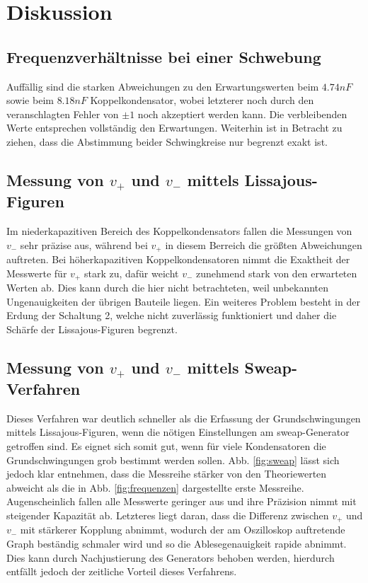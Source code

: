 \section{Diskussion}
\label{sec:Diskussion}

\subsection{Frequenzverhältnisse bei einer Schwebung}
\label{sec:Schwebung}

Auffällig sind die starken Abweichungen zu den Erwartungswerten beim $4.74nF$ sowie beim $8.18nF$ Koppelkondensator, wobei letzterer noch durch den veranschlagten Fehler von $\pm 1$ noch akzeptiert werden kann. Die verbleibenden Werte entsprechen vollständig den Erwartungen. Weiterhin ist in Betracht zu ziehen, dass die Abstimmung beider Schwingkreise nur begrenzt exakt ist.

\subsection{Messung von $v_+$ und $v_-$ mittels Lissajous-Figuren}
\label{sec:messung}

Im niederkapazitiven Bereich des Koppelkondensators fallen die Messungen von $v_-$ sehr präzise aus, während bei $v_+$ in diesem Berreich die größten Abweichungen auftreten. Bei höherkapazitiven Koppelkondensatoren nimmt die Exaktheit der Messwerte für $v_+$ stark zu, dafür weicht $v_-$ zunehmend stark von den erwarteten Werten ab. Dies kann durch die hier nicht betrachteten, weil unbekannten Ungenauigkeiten der übrigen Bauteile liegen. Ein weiteres Problem besteht in der Erdung der Schaltung 2, welche nicht zuverlässig funktioniert und daher die Schärfe der Lissajous-Figuren begrenzt.

\subsection{Messung von $v_+$ und $v_-$ mittels Sweap-Verfahren}
\label{sec:sweap}

Dieses Verfahren war deutlich schneller als die Erfassung der Grundschwingungen mittels Lissajous-Figuren, wenn die nötigen Einstellungen am sweap-Generator getroffen sind. Es eignet sich somit gut, wenn für viele Kondensatoren die Grundschwingungen grob bestimmt werden sollen. Abb. \ref{fig:sweap} lässt sich jedoch klar entnehmen, dass die Messreihe stärker von den Theoriewerten abweicht als die in Abb. \ref{fig:frequenzen} dargestellte erste Messreihe. Augenscheinlich fallen alle Messwerte geringer aus und ihre Präzision nimmt mit steigender Kapazität ab. Letzteres liegt daran, dass die Differenz zwischen $v_+$ und $v_-$ mit stärkerer Kopplung abnimmt, wodurch der am Oszilloskop auftretende Graph beständig schmaler wird und so die Ablesegenauigkeit rapide abnimmt. Dies kann durch Nachjustierung des Generators behoben werden, hierdurch entfällt jedoch der zeitliche Vorteil dieses Verfahrens.
